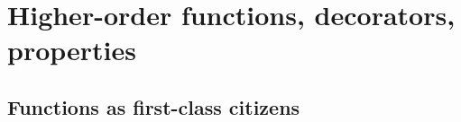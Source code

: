 \documentclass[a4paper]{article}
\begin{document}






\newpage
\tableofcontents
\newpage



\section{Higher-order functions, decorators, properties}


\subsection{Functions as first-class citizens}
\end{document}
